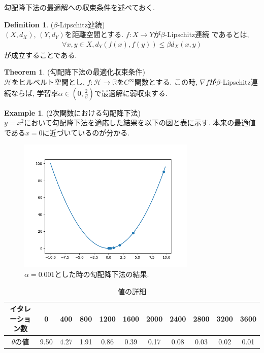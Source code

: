 \documentclass[11pt, a4paper, dvipdfmx]{jsarticle}
\theoremstyle{definition}
\newtheorem{Definition+}[Axiom+]{Definition}
\newtheorem{Theorem+}[Axiom+]{Theorem}
\newtheorem{Example+}[Axiom+]{Example}
\newcommand{\R}{\mathbb{R}}
\newcommand{\Hil}{\mathcal{H}}
\begin{document}
勾配降下法の最適解への収束条件を述べておく.
\begin{Definition+}($\beta$-Lipschitz連続)\\
    $(X, d_{X})$, $(Y, d_{Y})$を距離空間とする. $f:X\to Y$が$\beta$-Lipschitz連続
    であるとは,
    \begin{align*}
        \forall x, y\in X, d_{Y}(f(x), f(y))\leq\beta d_{X}(x, y)
    \end{align*}
    が成立することである.
\end{Definition+}
\begin{Theorem+}(勾配降下法の最適化収束条件)\\
    $\Hil$をヒルベルト空間とし, $f:\Hil\to\R$を$C^{\infty}$関数とする. 
    この時, $\nabla f$が$\beta$-Lipschitz連続ならば, 学習率$\alpha\in\left(0, \frac{2}{\beta}\right)$で最適解に弱収束する.
\end{Theorem+}
\begin{Example+}(2次関数における勾配降下法)\\
    $y = x^2$において勾配降下法を適応した結果を以下の図と表に示す.
    本来の最適値である$x = 0$に近づいているのが分かる.
    \begin{figure}[H]
        \centering
        \includegraphics[width = 8.5cm]{Gradient_Decent.png}
        \caption{$\alpha = 0.001$とした時の勾配降下法の結果.}
    \end{figure}
    \begin{table}[H]
        \centering
        \begin{tabular}{|c|c|c|c|c|c|c|c|c|c|c|}\hline
            イタレーション数 & 0 & 400 & 800 & 1200 & 1600 & 2000 & 2400 & 2800 & 3200 & 3600\\\hline
            $\theta$の値 & 9.50 & 4.27 & 1.91 & 0.86 & 0.39 & 0.17 & 0.08 & 0.03 & 0.02 & 0.01\\\hline
        \end{tabular}
        \caption{値の詳細}
    \end{table}
\end{Example+}
\end{document}
